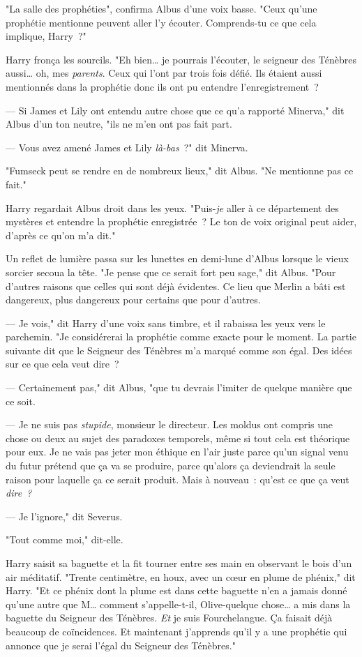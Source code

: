 "La salle des prophéties", confirma Albus d'une voix basse. "Ceux qu'une prophétie mentionne peuvent aller l'y écouter. Comprends-tu ce que cela implique, Harry~?"

Harry fronça les sourcils. "Eh bien… je pourrais l'écouter, le seigneur des Ténèbres aussi… oh, mes \emph{parents}. Ceux qui l'ont par trois fois défié. Ils étaient aussi mentionnés dans la prophétie donc ils ont pu entendre l'enregistrement~?

--- Si James et Lily ont entendu autre chose que ce qu'a rapporté Minerva," dit Albus d'un ton neutre, "ils ne m'en ont pas fait part.

--- Vous avez amené James et Lily \emph{là-bas}~?" dit Minerva.

"Fumseck peut se rendre en de nombreux lieux," dit Albus. "Ne mentionne pas ce fait."

Harry regardait Albus droit dans les yeux. "Puis-\emph{je} aller à ce département des mystères et entendre la prophétie enregistrée~? Le ton de voix original peut aider, d'après ce qu'on m'a dit."

Un reflet de lumière passa sur les lunettes en demi-lune d'Albus lorsque le vieux sorcier secoua la tête. "Je pense que ce serait fort peu sage," dit Albus. "Pour d'autres raisons que celles qui sont déjà évidentes. Ce lieu que Merlin a bâti est dangereux, plus dangereux pour certains que pour d'autres.

--- Je vois," dit Harry d'une voix sans timbre, et il rabaissa les yeux vers le parchemin. "Je considérerai la prophétie comme exacte pour le moment. La partie suivante dit que le Seigneur des Ténèbres m'a marqué comme son égal. Des idées sur ce que cela veut dire~?

--- Certainement pas," dit Albus, "que tu devrais l'imiter de quelque manière que ce soit.

--- Je ne suis pas \emph{stupide}, monsieur le directeur. Les moldus ont compris une chose ou deux au sujet des paradoxes temporels, même si tout cela est théorique pour eux. Je ne vais pas jeter mon éthique en l'air juste parce qu'un signal venu du futur prétend que ça va se produire, parce qu'alors ça deviendrait la seule raison pour laquelle ça ce serait produit. Mais à nouveau~: qu'est ce que ça veut \emph{dire~?}

--- Je l'ignore," dit Severus.

"Tout comme moi," dit-elle.

Harry saisit sa baguette et la fit tourner entre ses main en observant le bois d'un air méditatif. "Trente centimètre, en houx, avec un cœur en plume de phénix," dit Harry. "Et ce phénix dont la plume est dans cette baguette n'en a jamais donné qu'une autre que M… comment s'appelle-t-il, Olive-quelque chose… a mis dans la baguette du Seigneur des Ténèbres. \emph{Et} je suis Fourchelangue. Ça faisait déjà beaucoup de coïncidences. Et maintenant j'apprends qu'il y a une prophétie qui annonce que je serai l'égal du Seigneur des Ténèbres."

